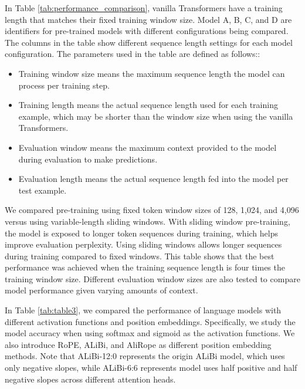 In Table \ref{tab:performance_comparison}, vanilla Transformers have a training length that matches their fixed training window size. Model A, B, C, and D are identifiers for pre-trained models with different configurations being compared. The columns in the table show different sequence length settings for each model configuration. The parameters used in the table are defined as follows::
\begin{itemize}[leftmargin=*, itemsep=0pt]
    \item Training window size means the maximum sequence length the model can process per training step. 
    \item Training length means the actual sequence length used for each training example, which may be shorter than the window size when using the vanilla Transformers. 
    \item Evaluation window means the maximum context provided to the model during evaluation to make predictions. 
    \item Evaluation length means the actual sequence length fed into the model per test example.
\end{itemize}

We compared pre-training using fixed token window sizes of 128, 1,024, and 4,096 versus using variable-length sliding windows. 
With sliding window pre-training, the model is exposed to longer token sequences during training, which helps improve evaluation perplexity. 
Using sliding windows allows longer sequences during training compared to fixed windows. This table shows that the best performance was achieved when the training sequence length is four times the training window size. Different evaluation window sizes are also tested to compare model performance given varying amounts of context.

In Table \ref{tab:table3}, we compared the performance of language models with different activation functions and position embeddings. Specifically, we study the model accuracy when using softmax and sigmoid as the activation functions. We also introduce RoPE, ALiBi, and AliRope as different position embedding methods. Note that ALiBi-12:0 represents the origin ALiBi model, which uses only negative slopes, while ALiBi-6:6 represents model uses half positive and half negative slopes across different attention heads.













